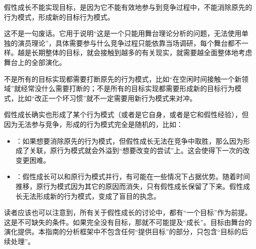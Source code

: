 假性成长不能实现目标，是因为它不能有效地参与到竞争过程中，不能消除原先的行为模式，形成新的目标行为模式。
\begin{explain}
这不是一句废话。它用于说明“这是一个只能用舞台理论分析的问题，无法使用单独的演员理论”，具体需要参与什么竞争过程只能依靠当场调研，每个舞台都不一样。越是长期整体的目标，就会接触到越多的有关现实，就需要越全面整体地考虑舞台上的全部演化。

不是所有的目标实现都需要打断原先的行为模式，比如“在空闲时间接触一个新领域”就经常没什么需要打断的；不是所有的目标实现都需要形成新的目标行为模式，比如“改正一个坏习惯”就不一定需要用新行为模式来对冲。
\insertparanotes
\end{explain}
假性成长确实也形成了某个行为模式（或者是它自身，或者是它和假性经验），但因为无法参与竞争，形成的行为模式完全是随机的，比如：
\begin{explain}
\begin{itemize}
\item {}：如果想要消除原先的行为模式，但假性成长无法在竞争中取胜，那么因为形成了关联，原行为模式就会外溢到“想要改变的尝试”上。这会使得下一次的改变更困难。
\item {}：假性成长可以和原行为模式并行，有可能在一些情况下占据优势。随着时间推移，原行为模式因为其它的原因而消失，只有假性成长保留了下来。假性成长无法形成新的行为模式，变成了盲目的执念。
\end{itemize}
\insertparanotes
\end{explain}
读者应该也可以注意到，所有关于假性成长的讨论中，都有“一个目标”作为前提。这是不可缺失的条件。如果完全没有目标，那就不可能提及“成长”。目标由舞台的演化提供。本指南的分析框架中不包含任何“提供目标”的部分，只包含“目标的后续处理”。
\insertparanotes
